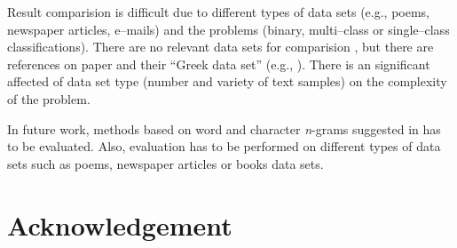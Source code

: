 \documentclass[11pt,english]{article}
\begin{document}
\begin{multicols}{2}
Result comparision is difficult due to different types of data sets (e.g., poems,
newspaper articles, e--mails) and the problems (binary, multi--class or
single--class classifications). There are no relevant data sets for comparision
\citep{zhao2005effective}, but there are references on paper
\citep{stamatatos2001computer} and their ``Greek data set'' (e.g.,
\citep{keselj2003n}). There is an significant affected of data set type (number
and variety of text samples) on the complexity of the problem.

In future work, methods based on word and character \emph{n}-grams suggested
in \citep{keselj2003n,peng2003language,coyotl2006authorship} has to be
evaluated. Also, evaluation has to be performed on different types of data sets
such as poems, newspaper articles or books data sets.

\section*{Acknowledgement}




\end{multicols}
\end{document}
